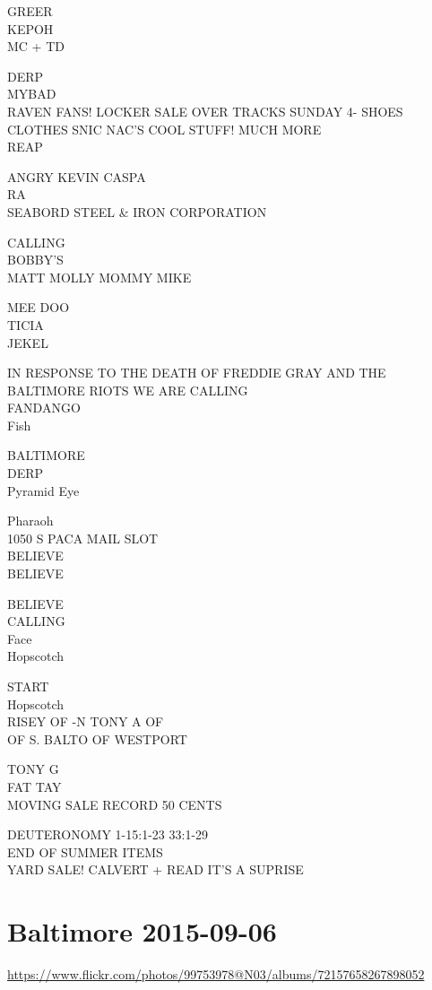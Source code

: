 \documentclass[10pt,letterpaper]{article}
\begin{document}
GREER\\
KEPOH\\
MC + TD

DERP\\
MYBAD\\
RAVEN FANS!  LOCKER SALE OVER TRACKS SUNDAY 4{-} SHOES CLOTHES SNIC NAC'S COOL STUFF!  MUCH MORE\\
REAP

ANGRY KEVIN CASPA\\
RA\\
SEABORD STEEL \& IRON CORPORATION

CALLING\\
BOBBY'S\\
MATT MOLLY MOMMY MIKE

MEE DOO\\
TICIA\\
JEKEL

IN RESPONSE TO THE DEATH OF FREDDIE GRAY AND THE BALTIMORE RIOTS WE ARE CALLING\\
FANDANGO\\
Fish

BALTIMORE\\
DERP\\
Pyramid Eye

Pharaoh\\
1050 S PACA MAIL SLOT\\
BELIEVE\\
BELIEVE

BELIEVE\\
CALLING\\
Face\\
Hopscotch

START\\
Hopscotch\\
RISEY OF {-}N TONY A OF\\
OF S. BALTO OF WESTPORT

TONY G\\
FAT TAY\\
MOVING SALE RECORD 50 CENTS

DEUTERONOMY 1{-}15:1{-}23 33:1{-}29\\
END OF SUMMER ITEMS\\
YARD SALE! CALVERT + READ IT'S A SUPRISE


\section*{Baltimore 2015-09-06}

\url{https://www.flickr.com/photos/99753978@N03/albums/72157658267898052}
\end{document}
